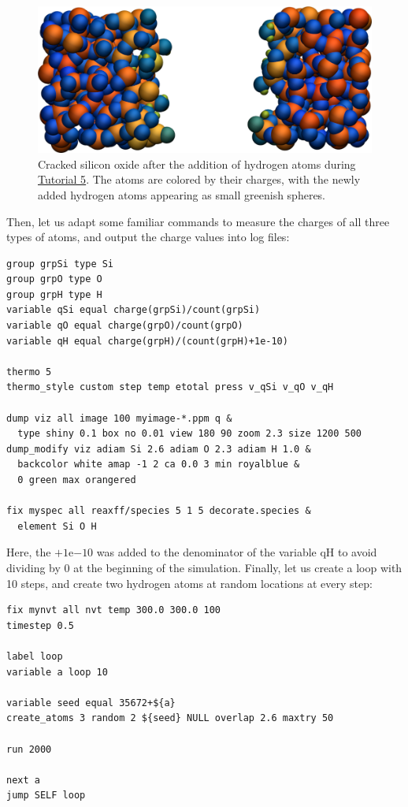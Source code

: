 \documentclass[9pt,tutorial]{livecoms}
\newcommand{\lmpcmd}[1]{\hspace{0pt}\colorbox{listing}{\textcolor{command}{\small{#1}}}\hspace{0pt}} %
\begin{document}
\begin{figure}
\includegraphics[width=\linewidth]{SIO-decorated}
\caption{Cracked silicon oxide after the addition of hydrogen atoms
during \hyperref[reactive-silicon-dioxide-label]{Tutorial 5}.  The atoms
are colored by their charges, with the newly added hydrogen atoms appearing as small
greenish spheres.}
\label{fig:SIO-decorated}
\end{figure}

Then, let us adapt some familiar commands to measure the charges of all three
types of atoms, and output the charge values into log files:
\begin{lstlisting}
group grpSi type Si
group grpO type O
group grpH type H
variable qSi equal charge(grpSi)/count(grpSi)
variable qO equal charge(grpO)/count(grpO)
variable qH equal charge(grpH)/(count(grpH)+1e-10)

thermo 5
thermo_style custom step temp etotal press v_qSi v_qO v_qH

dump viz all image 100 myimage-*.ppm q &
  type shiny 0.1 box no 0.01 view 180 90 zoom 2.3 size 1200 500
dump_modify viz adiam Si 2.6 adiam O 2.3 adiam H 1.0 &
  backcolor white amap -1 2 ca 0.0 3 min royalblue &
  0 green max orangered

fix myspec all reaxff/species 5 1 5 decorate.species &
  element Si O H
\end{lstlisting}
Here, the $+1 \mathrm{e}{-10}$ was added to the denominator of the \lmpcmd{variable qH}
to avoid dividing by 0 at the beginning of the simulation.  Finally, let us
create a loop with 10 steps, and create two hydrogen atoms at random locations at
every step:
\begin{lstlisting}
fix mynvt all nvt temp 300.0 300.0 100
timestep 0.5

label loop
variable a loop 10

variable seed equal 35672+${a}
create_atoms 3 random 2 ${seed} NULL overlap 2.6 maxtry 50

run 2000

next a
jump SELF loop
\end{lstlisting}
\end{document}
